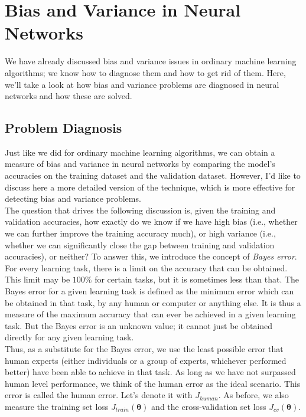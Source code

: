\documentclass[a4paper, 12pt]{report}
\begin{document}
\newpage

\chapter{Bias and Variance in Neural Networks}
We have already discussed bias and variance issues in ordinary machine learning algorithms; we know how to diagnose them and how to get rid of them. Here, we'll take a look at how bias and variance problems are diagnosed in neural networks and how these are solved.

\section{Problem Diagnosis}
Just like we did for ordinary machine learning algorithms, we can obtain a measure of bias and variance in neural networks by comparing the model's accuracies on the training dataset and the validation dataset. However, I'd like to discuss here a more detailed version of the technique, which is more effective for detecting bias and variance problems. \\
\break
The question that drives the following discussion is, given the training and validation accuracies, how exactly do we know if we have high bias (i.e., whether we can further improve the training accuracy much), or high variance (i.e., whether we can significantly close the gap between training and validation accuracies), or neither? To answer this, we introduce the concept of \textit{Bayes error}. For every learning task, there is a limit on the accuracy that can be obtained. This limit may be $100\%$ for certain tasks, but it is sometimes less than that. The Bayes error for a given learning task is defined as the minimum error which can be obtained in that task, by any human or computer or anything else. It is thus a measure of the maximum accuracy that can ever be achieved in a given learning task. But the Bayes error is an unknown value; it cannot just be obtained directly for any given learning task.\\
\break
Thus, as a substitute for the Bayes error, we use the least possible error that human experts (either individuals or a group of experts, whichever performed better) have been able to achieve in that task. As long as we have not surpassed human level performance, we think of the human error as the ideal scenario. This error is called the human error. Let's denote it with $J_{human}$. As before, we also measure the training set loss $J_{train}\left(\bm{\theta}\right)$ and the cross-validation set loss $J_{cv}\left(\bm{\theta}\right)$.\\
\end{document}
